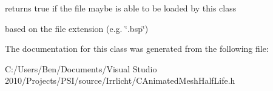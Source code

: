 returns true if the file maybe is able to be loaded by this class 

based on the file extension (e.\-g. \char`\"{}.\-bsp\char`\"{}) 

The documentation for this class was generated from the following file\-:\begin{DoxyCompactItemize}
\item 
C\-:/\-Users/\-Ben/\-Documents/\-Visual Studio 2010/\-Projects/\-P\-S\-I/source/\-Irrlicht/C\-Animated\-Mesh\-Half\-Life.\-h\end{DoxyCompactItemize}
